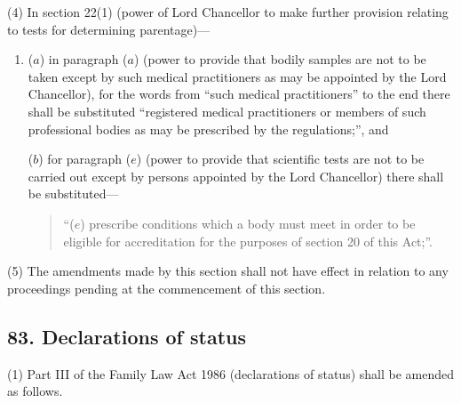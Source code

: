 \documentclass[12pt,a4paper]{article}
\begin{document}
(4) In section 22(1)  (power of Lord Chancellor to make further provision relating to tests for determining parentage)—
\begin{enumerate}\item[]
($a$) in paragraph ($a$)  (power to provide that bodily samples are not to be taken except by such medical practitioners as may be appointed by the Lord Chancellor), for the words from “such medical practitioners” to the end there shall be substituted “registered medical practitioners or members of such professional bodies as may be prescribed by the regulations;”, and

($b$) for paragraph ($e$)  (power to provide that scientific tests are not to be carried out except by persons appointed by the Lord Chancellor) there shall be substituted—
\begin{quotation}
“($e$) prescribe conditions which a body must meet in order to be eligible for accreditation for the purposes of section 20 of this Act;”.
\end{quotation}
\end{enumerate}

(5) The amendments made by this section shall not have effect in relation to any proceedings pending at the commencement of this section.

\subsection{83. Declarations of status}

(1) Part III of the Family Law Act 1986 (declarations of status) shall be amended as follows.
\end{document}
